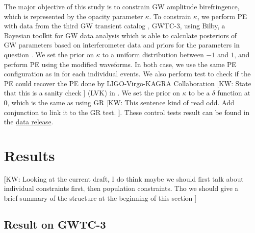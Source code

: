 \documentclass[aps,prd,twocolumn,superscriptaddress,preprintnumbers,floatfix,nofootinbib]{revtex4-2}
\newcommand{\kw}[1]{{\color{rb4}[KW: #1 ]}}
\begin{document}
The major objective of this study is to constrain GW amplitude birefringence,
which is represented by the opacity parameter $\kappa$. To constrain $\kappa$,
we perform PE with data from the third GW transient catalog \citep{GWTC-2.1,
GWTC-3}, GWTC-3, using Bilby, a Bayesian toolkit for GW data analysis which is
able to calculate posteriors of GW parameters based on interferometer data and
priors for the parameters in question \citep{Bilby}. We set the prior on
$\kappa$ to a uniform distribution between $-1$ and $1$, and perform PE using
the modified waveforms. In both case, we use the same PE configuration as in
\citet{GWTC-2.1, GWTC-3} for each individual events. We also perform test to
check if the PE could recover the PE done by LIGO-Virgo-KAGRA Collaboration
\kw{State that this is a sanity check} (LVK) in \citet{GWTC-2.1, GWTC-3}. We set
the prior on $\kappa$ to be a $\delta$ function at $0$, which is the same as
using GR \kw{This sentence kind of read odd. Add conjunction to link it to the
GR test.}. These control tests result can be found in the \href{https://zenodo.org/record/7338924}{data release}.

\section{Results}
\label{sec:Results}

\kw{Looking at the current draft, I do think maybe we should first talk about
 individual constraints first, then population constraints. Tho we should give a
 brief summary of the structure at the beginning of this section}
\subsection{Result on GWTC-3}
\end{document}
